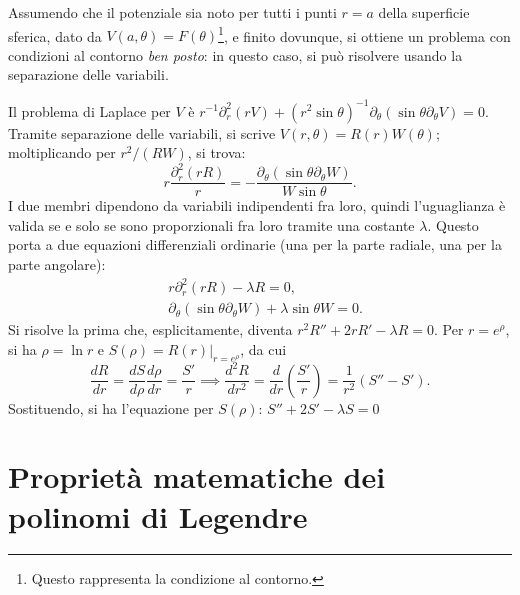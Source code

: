 \documentclass[11pt, a4paper]{scrartcl}
\theoremstyle{definition}
\numberwithin{esempio}{section}
\theoremstyle{definition}
\numberwithin{obs}{section}
\numberwithin{nota}{section}
\numberwithin{equation}{subsection}
\begin{document}
Assumendo che il potenziale sia noto per tutti i punti $r = a$ della superficie sferica, dato da $V(a,\theta ) = F(\theta )$\footnote{Questo rappresenta la condizione al contorno.}, e finito dovunque, si ottiene un problema con condizioni al contorno \textit{ben posto}: in questo caso, si pu\`o risolvere usando la separazione delle variabili.

Il problema di Laplace per $V$ \`e $r^{-1} \partial ^2_r (rV) + (r^2 \sin \theta )^{-1} \partial _\theta (\sin \theta \partial _\theta V)= 0$.
Tramite separazione delle variabili, si scrive $V(r,\theta ) = R(r) W(\theta )$; moltiplicando per $r^2 / (RW)$, si trova:
\begin{equation}
	r \frac{\partial _r^2(rR)}{r} = - \frac{\partial _\theta (\sin \theta \partial _\theta W)}{W\sin \theta }.
\end{equation}
I due membri dipendono da variabili indipendenti fra loro, quindi l'uguaglianza \`e valida se e solo se sono proporzionali fra loro tramite una costante $\lambda$. 
Questo porta a due equazioni differenziali ordinarie (una per la parte radiale, una per la parte angolare):
\[
\begin{split}
	&r \partial _r^2(r R) - \lambda R = 0, \\
	& \partial _\theta (\sin \theta \partial _\theta W) + \lambda \sin \theta W= 0 .
\end{split}
\] 
Si risolve la prima che, esplicitamente, diventa $r^2 R''+ 2rR' - \lambda R = 0$.
Per $r = e^\rho $, si ha $\rho  = \ln r$ e $S(\rho ) = R(r)|_{r= e^\rho } $, da cui
\[
	\frac{d R}{d r} = \frac{d S}{d \rho } \frac{d \rho }{d r} = \frac{S'}{r} \implies \frac{d ^2 R}{d r^2} =  \frac{d }{d r} \left(\frac{S'}{r}\right) = \frac{1}{r^2} (S'' - S'). 
\] 
Sostituendo, si ha l'equazione per $S(\rho )$: $S'' + 2S' - \lambda S = 0$


\newpage
\section{Propriet\`a matematiche dei polinomi di Legendre}
\end{document}
